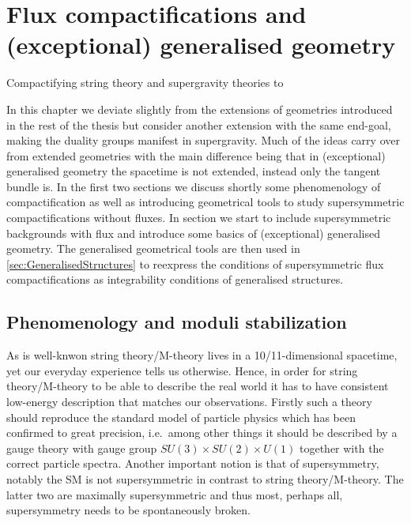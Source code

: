 \chapter{Flux compactifications and (exceptional) generalised
geometry\label{chap:FluxCompactifications}}
Compactifying string theory and supergravity theories to 

In this chapter we deviate slightly from the extensions of geometries introduced in the rest of the thesis but consider another extension with the same end-goal, making the duality groups manifest in supergravity. Much of the ideas carry over from extended geometries with the main difference being that in (exceptional) generalised geometry the spacetime is not extended, instead only the tangent bundle is. In the first two sections we discuss shortly some phenomenology of compactification as well as introducing geometrical tools to study supersymmetric compactifications without fluxes. In section we start to include supersymmetric backgrounds with flux and introduce some basics of (exceptional) generalised geometry. The generalised geometrical tools are then used in \ref{sec:GeneralisedStructures} to reexpress the conditions of supersymmetric flux compactifications as integrability conditions of generalised structures. 

\section{Phenomenology and moduli stabilization}
As is well-knwon string theory/M-theory lives in a 10/11-dimensional spacetime, yet our everyday experience tells us otherwise. Hence, in order for string theory/M-theory to be able to describe the real world it has to have consistent low-energy description that matches our observations. Firstly such a theory should reproduce the standard model of particle physics which has been confirmed to great precision, i.e.\ among other things it should be described by a gauge theory with gauge group $SU(3)\times SU(2)\times U(1)$ together with the correct particle spectra. Another important notion is that of supersymmetry, notably the SM is not supersymmetric in contrast to string theory/M-theory. The latter two are maximally supersymmetric and thus most, perhaps all, supersymmetry needs to be spontaneously broken. %

